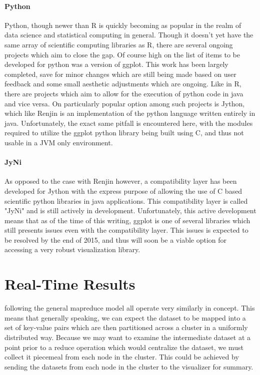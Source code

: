 \paragraph{Python}
Python, though newer than R is quickly becoming as popular in the realm of data science and statistical computing in general. Though it doesn't yet have the same array of scientific computing libraries as R, there are several ongoing projects which aim to close the gap. Of course high on the list of items to be developed for python was a version of ggplot. This work has been largely completed, save for minor changes which are still being made based on user feedback and some small aesthetic adjustments which are ongoing. Like in R, there are projects which aim to allow for the execution of python code in java and vice versa. On particularly popular option among such projects is Jython, which like Renjin is an implementation of the python language written entirely in java. Unfortunately, the exact same pitfall is encountered here, with the modules required to utilize the ggplot python library being built using C, and thus not usable in a JVM only environment. 

\paragraph{JyNi}
As opposed to the case with Renjin however, a compatibility layer has been developed for Jython with the express purpose of allowing the use of C based scientific python libraries in java applications. This compatibility layer is called "JyNi" \cite{Richthofer2013} and is still actively in development. Unfortunately, this active development means that as of the time of this writing, ggplot is one of several libraries which still presents issues even with the compatibility layer. This issues is expected to be resolved by the end of 2015, and thus will soon be a viable option for accessing a very robust visualization library.

\section{Real-Time Results}
\label{sec:realtime}
 following the general mapreduce model all operate very similarly in concept. This means that generally speaking, we can expect the dataset to be mapped into a set of key-value pairs which are then partitioned across a cluster in a uniformly distributed way. Because we may want to examine the intermediate dataset at a point prior to a reduce operation which would centralize the dataset, we must collect it piecemeal from each node in the cluster. This could be achieved by sending the datasets from each node in the cluster to the visualizer for summary. 

